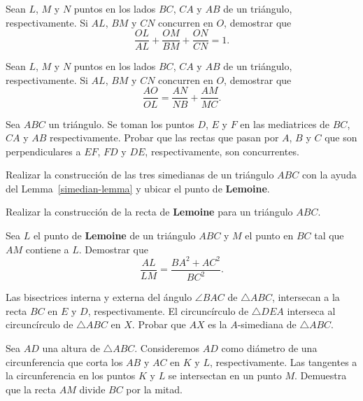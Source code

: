 \begin{section-exercise}
    Sean $L$, $M$ y $N$ puntos en los lados $BC$, $CA$ y $AB$ de un triángulo, respectivamente.
    Si $AL$, $BM$ y $CN$ concurren en $O$, demostrar que
    \[\frac{OL}{AL} + \frac{OM}{BM} + \frac{ON}{CN} = 1.\]
\end{section-exercise}

\begin{section-exercise}
    Sean $L$, $M$ y $N$ puntos en los lados $BC$, $CA$ y $AB$ de un triángulo, respectivamente.
    Si $AL$, $BM$ y $CN$ concurren en $O$, demostrar que
    \[\frac{AO}{OL} = \frac{AN}{NB} + \frac{AM}{MC}.\]
\end{section-exercise}

\begin{section-problem}
    Sea $ABC$ un triángulo.
    Se toman los puntos $D$, $E$ y $F$ en las mediatrices de $BC$, $CA$ y $AB$ respectivamente.
    Probar que las rectas que pasan por $A$, $B$ y $C$ que son perpendiculares a $EF$, $FD$ y $DE$, respectivamente, son concurrentes.
\end{section-problem}

\begin{section-exercise}
    Realizar la construcción de las tres simedianas de un triángulo $ABC$ con la ayuda del Lemma~\ref{simedian-lemma} y ubicar el punto de \textbf{Lemoine}.
\end{section-exercise}

\begin{section-exercise}
    Realizar la construcción de la recta de \textbf{Lemoine} para un triángulo $ABC$.
\end{section-exercise}

\begin{section-problem}
    Sea $L$ el punto de \textbf{Lemoine} de un triángulo $ABC$ y $M$ el punto en $BC$ tal que $AM$ contiene a $L$.
    Demostrar que
    \[
        \frac{AL}{LM} = \frac{BA^2 + AC^2}{BC^2}.
    \]
\end{section-problem}

\begin{section-problem}
    Las bisectrices interna y externa del ángulo $\angle BAC$ de $\triangle ABC$, intersecan a la recta $BC$ en $E$ y $D$, respectivamente.
    El circuncírculo de $\triangle DEA$ interseca al circuncírculo de $\triangle ABC$ en $X$.
    Probar que $AX$ es la $A$-simediana de $\triangle ABC$.
\end{section-problem}

\begin{section-problem}
    Sea $AD$ una altura de $\triangle ABC$.
    Consideremos $AD$ como diámetro de una circunferencia que corta los $AB$ y $AC$ en $K$ y $L$, respectivamente.
    Las tangentes a la circunferencia en los puntos $K$ y $L$ se intersectan en un punto $M$.
    Demuestra que la recta $AM$ divide $BC$ por la mitad.
\end{section-problem}

